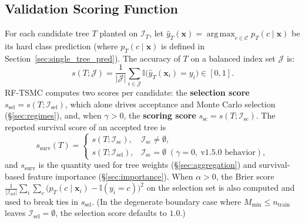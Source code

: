 \documentclass[11pt,a4paper]{article}
\newcommand{\Ind}{\mathbb{I}}
\DeclareMathOperator*{\argmax}{arg\,max}
\begin{document}
\subsection{Validation Scoring Function}
\label{sec:scoring}

For each candidate tree $T$ planted on $\mathcal{I}_T$, let $\hat{y}_T(\mathbf{x}) = \argmax_{c \in \mathcal{C}} p_T(c \mid \mathbf{x})$ be its hard class prediction (where $p_T(c \mid \mathbf{x})$ is defined in Section~\ref{sec:single_tree_pred}). The accuracy of $T$ on a balanced index set $\mathcal{J}$ is:
\begin{equation}
  s(T; \mathcal{J}) = \frac{1}{|\mathcal{J}|} \sum_{i \in \mathcal{J}} \Ind\!\big(\hat{y}_{T}(\mathbf{x}_{i}) = y_i\big) \in [0, 1].
\end{equation}
RF-TSMC computes two scores per candidate: the \textbf{selection score} $s_{\text{sel}} = s(T; \mathcal{I}_{\text{sel}})$, which alone drives acceptance and Monte Carlo selection (\S\ref{sec:regimes}), and, when $\gamma > 0$, the \textbf{scoring score} $s_{\text{sc}} = s(T; \mathcal{I}_{\text{sc}})$. The reported survival score of an accepted tree is
\begin{equation}
  s_{\text{surv}}(T) =
  \begin{cases}
    s(T; \mathcal{I}_{\text{sc}}), & \mathcal{I}_{\text{sc}} \neq \emptyset, \\
    s(T; \mathcal{I}_{\text{sel}}), & \mathcal{I}_{\text{sc}} = \emptyset \;(\gamma = 0,\ \text{v1.5.0 behavior}),
  \end{cases}
\end{equation}
and $s_{\text{surv}}$ is the quantity used for tree weights (\S\ref{sec:aggregation}) and survival-based feature importance (\S\ref{sec:importance}). When $\alpha > 0$, the Brier score $\frac{1}{|\mathcal{I}_{\text{sel}}|}\sum_{i} \sum_{c} \big(p_T(c \mid \mathbf{x}_i) - \Ind(y_i = c)\big)^2$ on the selection set is also computed and used to break ties in $s_{\text{sel}}$. (In the degenerate boundary case where $M_{\min} \le n_{\text{train}}$ leaves $\mathcal{I}_{\text{sel}} = \emptyset$, the selection score defaults to $1.0$.)
\end{document}
